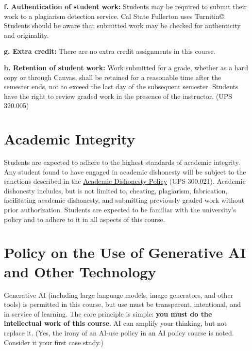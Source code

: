 \documentclass[12pt]{article}
\begin{document}
\vspace{1em}
\noindent \textbf{f. Authentication of student work:}
Students may be required to submit their work to a plagiarism detection service. Cal State Fullerton uses Turnitin\copyright. Students should be aware that submitted work may be checked for authenticity and originality.

\vspace{1em}
\noindent \textbf{g. Extra credit:}
There are no extra credit assignments in this course.

\vspace{1em}
\noindent \textbf{h. Retention of student work:}
Work submitted for a grade, whether as a hard copy or through Canvas, shall be retained for a reasonable time after the semester ends, not to exceed the last day of the subsequent semester. Students have the right to review graded work in the presence of the instructor. (UPS 320.005)

\section*{Academic Integrity}
Students are expected to adhere to the highest standards of academic integrity. Any student found to have engaged in academic dishonesty will be subject to the sanctions described in the \href{https://www.fullerton.edu/senate/publications_policies_resolutions/ups/UPS\%20300/UPS\%20300.021.pdf}{Academic Dishonesty Policy} (UPS 300.021). Academic dishonesty includes, but is not limited to, cheating, plagiarism, fabrication, facilitating academic dishonesty, and submitting previously graded work without prior authorization. Students are expected to be familiar with the university's policy and to adhere to it in all aspects of this course.

\section*{Policy on the Use of Generative AI and Other Technology}

Generative AI (including large language models, image generators, and other tools) is permitted in this course, but use must be transparent, intentional, and in service of learning. The core principle is simple: \textbf{you must do the intellectual work of this course}. AI can amplify your thinking, but not replace it. (Yes, the irony of an AI-use policy in an AI policy course is noted. Consider it your first case study.)
\end{document}
